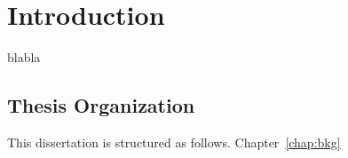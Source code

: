 \chapter{Introduction}   \label{chap:intro}

blabla

\section{Thesis Organization}

This dissertation is structured as follows. Chapter~\ref{chap:bkg}
